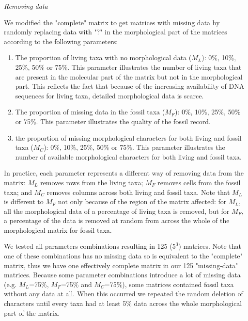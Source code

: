 \documentclass[12pt,letterpaper]{article}
\renewcommand{\subsection}[1]{%
\bigskip
\begin{center}
\begin{large}
\normalfont\itshape #1
\end{large}
\end{center}}
\begin{document}

\subsection{Removing data}
We modified the "complete" matrix to get matrices with missing data by randomly replacing data with "?" in the morphological part of the matrices according to the following parameters:%

\begin{enumerate}
\item{The proportion of living taxa with no morphological data ($M_{L}$): 0\%, 10\%, 25\%, 50\% or 75\%.}
This parameter illustrates the number of living taxa that are present in the molecular part of the matrix but not in the morphological part. This reflects the fact that because of the increasing availability of DNA sequences for living taxa, detailed morphological data is scarce.
\item{The proportion of missing data in the fossil taxa ($M_{F}$): 0\%, 10\%, 25\%, 50\% or 75\%.}
This parameter illustrates the quality of the fossil record. 
\item{the proportion of missing morphological characters for both living and fossil taxa ($M_{C}$): 0\%, 10\%, 25\%, 50\% or 75\%. }
This parameter illustrates the number of available morphological characters for both living and fossil taxa.
\end{enumerate}

In practice, each parameter represents a different way of removing data from the matrix: $M_{L}$ removes rows from the living taxa; $M_{F}$ removes cells from the fossil taxa; and $M_{C}$ removes columns across both living and fossil taxa. Note that $M_{L}$ is different to $M_{F}$ not only because of the region of the matrix affected: for $M_{L}$, all the morphological data of a percentage of living taxa is removed, but for $M_{F}$, a percentage of the data is removed at random from across the whole of the morphological matrix for fossil taxa.

We tested all parameters combinations resulting in 125 ($5^3$) matrices. Note that one of these combinations has no missing data so is equivalent to the "complete" matrix, thus we have one effectively complete matrix in our 125 "missing-data" matrices. Because some parameter combinations introduce a lot of missing data (e.g. $M_L$=75\%, $M_F$=75\% and $M_C$=75\%), some matrices contained fossil taxa without any data at all. When this occurred we repeated the random deletion of characters until every taxa had at least 5\% data across the whole morphological part of the matrix.
\end{document}
